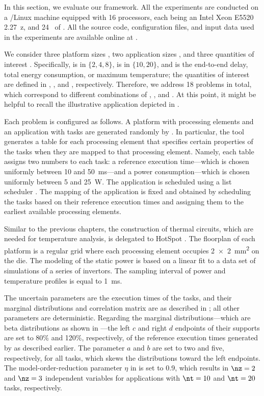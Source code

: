 In this section, we evaluate our framework. All the experiments are conducted on
a /Linux machine equipped with 16 processors, each being an Intel Xeon
E5520 2.27~z, and 24~ of . All the source code,
configuration files, and input data used in the experiments are available online
at \cite{eslab2017a}.

We consider three platform sizes \np, two application sizes \nt, and three
quantities of interest \g. Specifically, \np is in $\{ 2, 4, 8 \}$, \nt is in
$\{ 10, 20 \}$, and \g is the end-to-end delay, total energy consumption, or
maximum temperature; the quantities of interest are defined in
, , and ,
respectively. Therefore, we address 18 problems in total, which correspond to
different combinations of \np, \nt, and \g. At this point, it might be helpful
to recall the illustrative application depicted in .

Each problem is configured as follows. A platform with \np processing elements
and an application with \nt tasks are generated randomly by 
\cite{dick1998}. In particular, the tool generates a table for each processing
element that specifies certain properties of the tasks when they are mapped to
that processing element. Namely, each table assigns two numbers to each task: a
reference execution time---which is chosen uniformly between 10 and 50~ms---and
a power consumption---which is chosen uniformly between 5 and 25~W. The
application is scheduled using a list scheduler \cite{adam1974}. The mapping of
the application is fixed and obtained by scheduling the tasks based on their
reference execution times and assigning them to the earliest available
processing elements.

Similar to the previous chapters, the construction of thermal  circuits,
which are needed for temperature analysis, is delegated to HotSpot
\cite{skadron2003}. The floorplan of each platform is a regular grid where each
processing element occupies 2~×~2~mm\textsuperscript{2} on the die. The modeling
of the static power is based on a linear fit to a data set of 
simulations of a series of  invertors. The sampling interval of power
and temperature profiles is equal to 1~ms.

The uncertain parameters \vu are the execution times of the tasks, and their
marginal distributions and correlation matrix are as described in
; all other parameters are deterministic. Regarding the
marginal distributions---which are beta distributions as shown in
---the left $c$ and right $d$ endpoints of their
supports are set to 80\% and 120\%, respectively, of the reference execution
times generated by  as described earlier. The parameter $a$ and $b$ are
set to two and five, respectively, for all tasks, which skews the distributions
toward the left endpoints. The model-order-reduction parameter $\eta$ in
 is set to 0.9, which results in $\nz = 2$ and $\nz
= 3$ independent variables for applications with $\nt = 10$ and $\nt = 20$
tasks, respectively.

